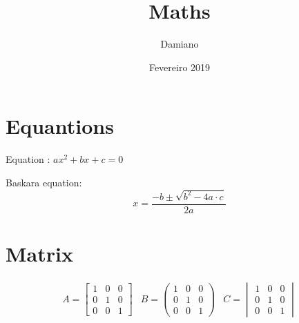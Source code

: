 \documentclass[12pt]{article}
\begin{document}
    \title{\Huge Maths}
    \author{Damiano}
    \date{Fevereiro 2019}
    \maketitle
    \thispagestyle{empty}

    \section{Equantions}
    
    Equation : $ ax^2+bx+c=0 $ 

    Baskara equation:     
    \begin{equation*}
        x = \frac{-b \pm \sqrt{b^2-4a\cdot c}}{2a}
    \end{equation*}
    
    \section{Matrix}
    
    \begin{equation*}
        \begin{array}{ccc}
        A =\begin{bmatrix}
            1 & 0 & 0 \\
            0 & 1 & 0 \\
            0 & 0 & 1
            \end{bmatrix} & 
        B =\begin{pmatrix}
            1 & 0 & 0 \\
            0 & 1 & 0 \\
            0 & 0 & 1
            \end{pmatrix} &         
        C =\begin{vmatrix}
            1 & 0 & 0 \\
            0 & 1 & 0 \\
            0 & 0 & 1
            \end{vmatrix}
        \end{array}
    \end{equation*}
    
\end{document}
